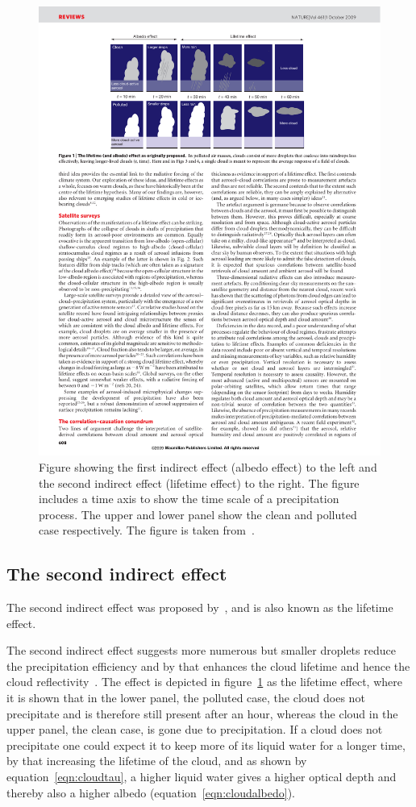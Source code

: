 \begin{figure}
\centering
\includegraphics[width=1.1\textwidth]{theory/indirecteffects.pdf}
\caption{Figure showing the first indirect effect (albedo effect) to the left and the second indirect effect (lifetime effect) to the right. The figure includes a time axis to show the time scale of a precipitation process. The upper and lower panel show the clean and polluted case respectively. The figure is taken from~\cite{Stevens2009}.}
\label{fig:indirecteffects}
\end{figure}

\subsection{The second indirect effect}
The second indirect effect was proposed by~\citet{Albrecht1989}, and is also known as the lifetime effect.

The second indirect effect suggests more numerous but smaller droplets reduce the precipitation efficiency and by that enhances the cloud lifetime and hence the cloud reflectivity~\citep{Albrecht1989}. The effect is depicted in figure~\ref{fig:indirecteffects} as the lifetime effect, where it is shown that in the lower panel, the polluted case, the cloud does not precipitate and is therefore still present after an hour, whereas the cloud in the upper panel, the clean case, is gone due to precipitation. If a cloud does not precipitate one could expect it to keep more of its liquid water for a longer time, by that increasing the lifetime of the cloud, and as shown by equation~\ref{eqn:cloudtau}, a higher liquid water gives a higher optical depth and thereby also a higher albedo (equation~\ref{eqn:cloudalbedo}).


